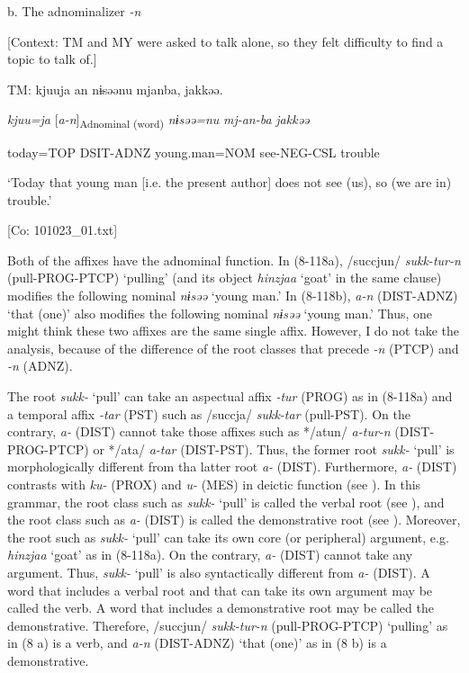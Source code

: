   b. The adnominalizer \textit{{}-n}

  [Context: TM and MY were asked to talk alone, so they felt difficulty to find a topic to talk of.]

  TM:   kjuuja  an  nɨsəənu  mjanba,  jakkəə.

    \textit{kjuu=ja}  [\textit{a-n}]\textsubscript{Adnominal (word)}  \textit{nɨsəə=nu}  \textit{mj-an-ba}  \textit{jakkəə}

    today=TOP  DSIT-ADNZ  young.man=NOM  see-NEG-CSL  trouble

    ‘Today that young man [i.e. the present author] does not see (us), so (we are in) trouble.’

  [Co: 101023\_01.txt]

Both of the affixes have the adnominal function. In (8\nobreakdash-118a), /succjun/ \textit{sukk-tur-n} (pull-PROG-PTCP) ‘pulling’ (and its object \textit{hinzjaa} ‘goat’ in the same clause) modifies the following nominal \textit{nɨsəə} ‘young man.’ In (8\nobreakdash-118b), \textit{a-n} (DIST-ADNZ) ‘that (one)’ also modifies the following nominal \textit{nɨsəə} ‘young man.’ Thus, one might think these two affixes are the same single affix. However, I do not take the analysis, because of the difference of the root classes that precede \textit{{}-n} (PTCP) and \textit{-n} (ADNZ).

The root \textit{sukk-} ‘pull’ can take an aspectual affix \textit{{}-tur} (PROG) as in (8\nobreakdash-118a) and a temporal affix \textit{{}-tar} (PST) such as /succja/ \textit{sukk-tar} (pull-PST). On the contrary, \textit{a-} (DIST) cannot take those affixes such as */atun/ \textit{a-tur-n} (DIST-PROG-PTCP) or */ata/ \textit{a-tar} (DIST-PST). Thus, the former root \textit{sukk-} ‘pull’ is morphologically different from tha latter root \textit{a-} (DIST). Furthermore, \textit{a-} (DIST) contrasts with \textit{ku-} (PROX) and \textit{u-} (MES) in deictic function (see ). In this grammar, the root class such as \textit{sukk-} ‘pull’ is called the verbal root (see ), and the root class such as \textit{a-} (DIST) is called the demonstrative root (see ). Moreover, the root such as \textit{sukk-} ‘pull’ can take its own core (or peripheral) argument, e.g. \textit{hinzjaa} ‘goat’ as in (8\nobreakdash-118a). On the contrary, \textit{a-} (DIST) cannot take any argument. Thus, \textit{sukk-} ‘pull’ is also syntactically different from \textit{a-} (DIST). A word that includes a verbal root and that can take its own argument may be called the verb. A word that includes a demonstrative root may be called the demonstrative. Therefore, /succjun/ \textit{sukk-tur-n} (pull-PROG-PTCP) ‘pulling’ as in (8 a) is a verb, and \textit{a-n} (DIST-ADNZ) ‘that (one)’ as in (8 b) is a demonstrative.

